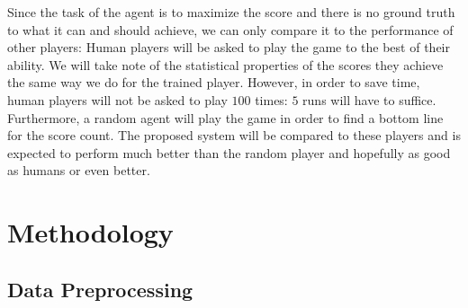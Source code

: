 \documentclass[a4paper,10pt]{article}
\begin{document}

Since the task of the agent is to maximize the score and there is no ground truth to what it can and should achieve, we can only compare it to the performance of other players:
Human players will be asked to play the game to the best of their ability.
We will take note of the statistical properties of the scores they achieve the same way we do for the trained player.
However, in order to save time, human players will not be asked to play $100$ times: $5$ runs will have to suffice.
Furthermore, a random agent will play the game in order to find a bottom line for the score count.
The proposed system will be compared to these players and is expected to perform much better than the random player and hopefully as good as humans or even better.
\section{Methodology}

\subsection{Data Preprocessing}
\label{datapreprocessing}
\end{document}
